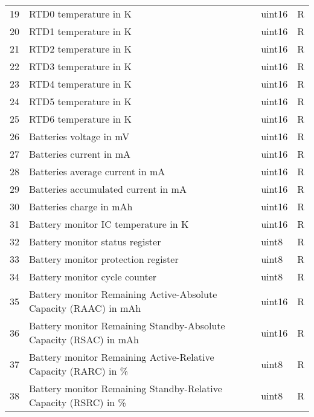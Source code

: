\begin{longtable}[c]{cL{0.72\textwidth}lc}
    19  & RTD0 temperature in K                                             & uint16 & R \\
    20  & RTD1 temperature in K                                             & uint16 & R \\
    21  & RTD2 temperature in K                                             & uint16 & R \\
    22  & RTD3 temperature in K                                             & uint16 & R \\
    23  & RTD4 temperature in K                                             & uint16 & R \\
    24  & RTD5 temperature in K                                             & uint16 & R \\
    25  & RTD6 temperature in K                                             & uint16 & R \\
    26  & Batteries voltage in mV                                           & uint16 & R \\
    27  & Batteries current in mA                                           & uint16 & R \\
    28  & Batteries average current in mA                                   & uint16 & R \\
    29  & Batteries accumulated current in mA                               & uint16 & R \\
    30  & Batteries charge in mAh                                           & uint16 & R \\
    31  & Battery monitor IC temperature in K                               & uint16 & R \\
    32  & Battery monitor status register                                   & uint8  & R \\
    33  & Battery monitor protection register                               & uint8  & R \\
    34  & Battery monitor cycle counter                                     & uint8  & R \\
    35  & Battery monitor Remaining Active-Absolute Capacity (RAAC) in mAh  & uint16 & R \\
    36  & Battery monitor Remaining Standby-Absolute Capacity (RSAC) in mAh & uint16 & R \\
    37  & Battery monitor Remaining Active-Relative Capacity (RARC) in \%   & uint8  & R \\
    38  & Battery monitor Remaining Standby-Relative Capacity (RSRC) in \%  & uint8  & R \\

\end{longtable}

